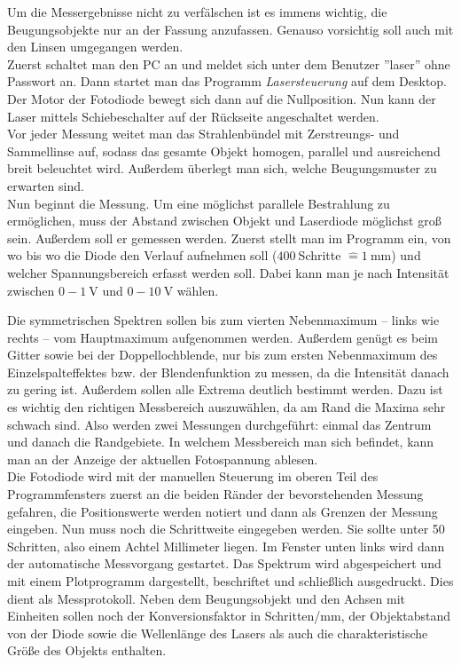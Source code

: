\documentclass[12pt,a4paper,titlepage,headinclude,bibtotoc]{scrartcl}
\newcommand{\corresponds}{\ensuremath{\mathrel{\widehat{=}}}}
\begin{document}
Um die Messergebnisse nicht zu verfälschen ist es immens wichtig, die Beugungsobjekte nur an der Fassung anzufassen.
Genauso vorsichtig soll auch mit den Linsen umgegangen werden.\\

Zuerst schaltet man den PC an und meldet sich unter dem Benutzer ''laser'' ohne Passwort an.
Dann startet man das Programm \emph{Lasersteuerung} auf dem Desktop.
Der Motor der Fotodiode bewegt sich dann auf die Nullposition.
Nun kann der Laser mittels Schiebeschalter auf der Rückseite angeschaltet werden.\\

Vor jeder Messung weitet man das Strahlenbündel mit Zerstreungs- und Sammellinse auf, sodass das gesamte Objekt homogen, parallel und ausreichend breit beleuchtet wird.
Außerdem überlegt man sich, welche Beugungsmuster zu erwarten sind.\\

Nun beginnt die Messung.
Um eine möglichst parallele Bestrahlung zu ermöglichen, muss der Abstand zwischen Objekt und Laserdiode möglichst groß sein.
Außerdem soll er gemessen werden.
Zuerst stellt man im Programm ein, von wo bis wo die Diode den Verlauf aufnehmen soll ($400~$Schritte $\corresponds 1~$mm) und welcher Spannungsbereich erfasst werden soll.
Dabei kann man je nach Intensität zwischen $0-1~$V und $0-10~$V wählen.

Die symmetrischen Spektren sollen bis zum vierten Nebenmaximum -- links wie rechts -- vom Hauptmaximum aufgenommen werden.
Außerdem genügt es beim Gitter sowie bei der Doppellochblende, nur bis zum ersten Nebenmaximum des Einzelspalteffektes bzw. der Blendenfunktion zu messen, da die Intensität danach zu gering ist.
Außerdem sollen alle Extrema deutlich bestimmt werden.
Dazu ist es wichtig den richtigen Messbereich auszuwählen, da am Rand die Maxima sehr schwach sind.
Also werden zwei Messungen durchgeführt: einmal das Zentrum und danach die Randgebiete.
In welchem Messbereich man sich befindet, kann man an der Anzeige der aktuellen Fotospannung ablesen.\\

Die Fotodiode wird mit der  manuellen Steuerung im oberen Teil des Programmfensters zuerst an die beiden Ränder der bevorstehenden Messung gefahren, die Positionswerte werden notiert und dann als Grenzen der Messung eingeben.
Nun muss noch die Schrittweite eingegeben werden.
Sie sollte unter 50 Schritten, also einem Achtel Millimeter liegen.
Im Fenster unten links wird dann der automatische Messvorgang gestartet.
Das Spektrum wird abgespeichert und mit einem Plotprogramm dargestellt, beschriftet und schließlich ausgedruckt.
Dies dient als Messprotokoll.
Neben dem Beugungsobjekt und den Achsen mit Einheiten sollen noch der Konversionsfaktor in Schritten/mm, der Objektabstand von der Diode sowie die Wellenlänge des Lasers als auch die charakteristische Größe des Objekts enthalten.\\
\end{document}
